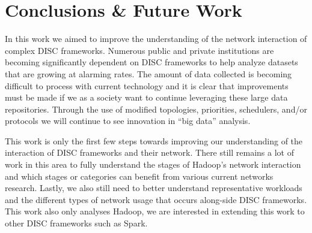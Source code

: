 \section{Conclusions \& Future Work}
In this work we aimed to improve the understanding of the network interaction of 
complex DISC frameworks. Numerous public and private institutions are becoming 
significantly dependent on DISC frameworks to help analyze datasets that are 
growing at alarming rates. The amount of data collected is becoming difficult 
to process with current technology and it is clear that improvements must be 
made if we as a society want to continue leveraging these large data repositories. 
Through the use of modified topologies, priorities, schedulers, and/or protocols we will  
continue to see innovation in ``big data'' analysis.

This work is only the first few steps towards improving our understanding of the interaction 
of DISC frameworks and their network. There still remains a lot of work in this area to 
fully understand the stages of Hadoop's network interaction and which stages or categories
can benefit from various current networks research. Lastly, we also still need to better 
understand representative workloads and the different types of network usage that occurs along-side
DISC frameworks. This work also only analyses Hadoop, we are interested in extending this work
to other DISC frameworks such as Spark.
